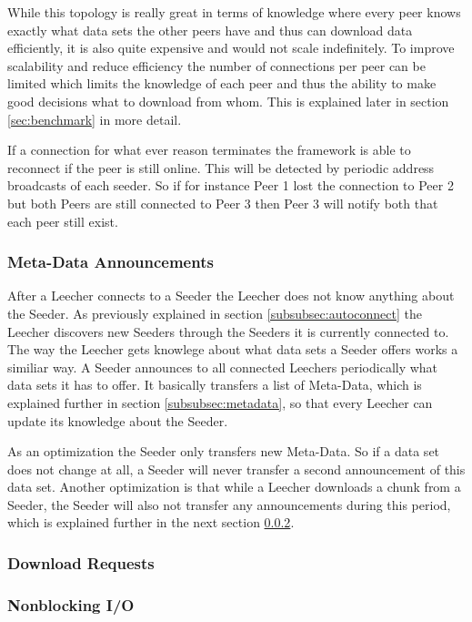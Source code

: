 While this topology is really great in terms of knowledge where every peer knows exactly what data sets the other peers have and thus can download data efficiently, it is also quite expensive and would not scale indefinitely. To improve scalability and reduce efficiency the number of connections per peer can be limited which limits the knowledge of each peer and thus the ability to make good decisions what to download from whom. This is explained later in section \ref{sec:benchmark} in more detail.

If a connection for what ever reason terminates the framework is able to reconnect if the peer is still online. This will be detected by periodic address broadcasts of each seeder. So if for instance Peer 1 lost the connection to Peer 2 but both Peers are still connected to Peer 3 then Peer 3 will notify both that each peer still exist.

\subsubsection{Meta-Data Announcements}

After a Leecher connects to a Seeder the Leecher does not know anything about the Seeder. As previously explained in section \ref{subsubsec:autoconnect} the Leecher discovers new Seeders through the Seeders it is currently connected to. The way the Leecher gets knowlege about what data sets a Seeder offers works a similiar way. A Seeder announces to all connected Leechers periodically what data sets it has to offer. It basically transfers a list of Meta-Data, which is explained further in section \ref{subsubsec:metadata}, so that every Leecher can update its knowledge about the Seeder. 

As an optimization the Seeder only transfers new Meta-Data. So if a data set does not change at all, a Seeder will never transfer a second announcement of this data set. Another optimization is that while a Leecher downloads a chunk from a Seeder, the Seeder will also not transfer any announcements during this period, which is explained further in the next section \ref{subsubsec:downloadreq}.

\subsubsection{Download Requests}
\label{subsubsec:downloadreq}



\subsubsection{Nonblocking I/O}
